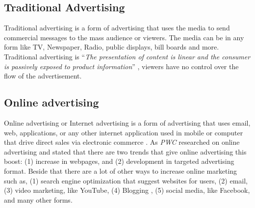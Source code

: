 \subsection{Traditional Advertising}
Traditional advertising is a form of advertising that uses the media to send commercial messages to the mass audience or viewers. The media can be in any form like TV, Newspaper, Radio, public displays, bill boards and more. Traditional advertising is ``\emph{The presentation of content is linear and the consumer is passively exposed to product information}'' \cite{Non_inter_vs_interAd}, viewers have no control over the flow of the advertisement. 


\subsection{Online advertising}
Online advertising or Internet advertising is a form of advertising that uses email, web, applications, or any other internet application used in mobile or computer that drive direct sales via electronic commerce \cite{onlinead}. As \emph{PWC}  \cite{pwc} researched on online advertising and stated that there are two trends that give online advertising this boost: (1) increase in webpages, and (2) development in targeted advertising format. Beside that there are a lot of other ways to increase online marketing \cite{waysmarketing} such as, (1) search engine optimization that suggest websites for users, (2) email, (3) video marketing, like YouTube, (4) Blogging , (5) social media, like Facebook, and many other forms.


